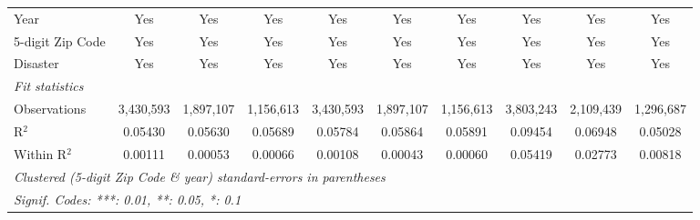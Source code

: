 \begin{tabular}{lccccccccc}
   Year                                                       & Yes             & Yes            & Yes           & Yes       & Yes           & Yes           & Yes           & Yes           & Yes\\  
   5-digit Zip Code                                           & Yes             & Yes            & Yes           & Yes       & Yes           & Yes           & Yes           & Yes           & Yes\\  
   Disaster                                                   & Yes             & Yes            & Yes           & Yes       & Yes           & Yes           & Yes           & Yes           & Yes\\  
   \midrule
   \emph{Fit statistics}\\
   Observations                                               & 3,430,593       & 1,897,107      & 1,156,613     & 3,430,593 & 1,897,107     & 1,156,613     & 3,803,243     & 2,109,439     & 1,296,687\\  
   R$^2$                                                      & 0.05430         & 0.05630        & 0.05689       & 0.05784   & 0.05864       & 0.05891       & 0.09454       & 0.06948       & 0.05028\\  
   Within R$^2$                                               & 0.00111         & 0.00053        & 0.00066       & 0.00108   & 0.00043       & 0.00060       & 0.05419       & 0.02773       & 0.00818\\  
   \midrule \midrule
   \multicolumn{10}{l}{\emph{Clustered (5-digit Zip Code \& year) standard-errors in parentheses}}\\
   \multicolumn{10}{l}{\emph{Signif. Codes: ***: 0.01, **: 0.05, *: 0.1}}\\
\end{tabular}
\par\endgroup
